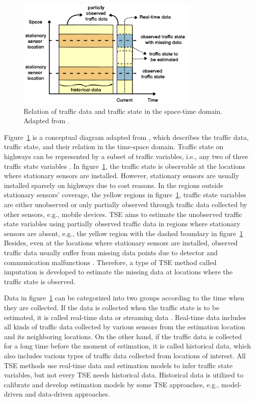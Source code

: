 \documentclass[english]{kththesis}
\begin{document}
\begin{figure}[!ht]
    \centering
    \includegraphics[width=0.8\textwidth]{tse_diagram.png}
    \caption{Relation of traffic data and traffic state in the space-time domain. Adapted from \cite{seo_tse}.}
    \label{fig:tse}
\end{figure}

Figure~\ref{fig:tse} is a conceptual diagram adapted from \cite{seo_tse}, which describes the traffic data, traffic state, and their relation in the time-space domain. Traffic state on highways can be represented by a subset of traffic variables, i.e., any two of three traffic state variables \cite{seo_tse}. In figure~\ref{fig:tse}, the traffic state is observable at the locations where stationary sensors are installed. However, stationary sensors are usually installed sparsely on highways due to cost reasons. In the regions outside stationary sensors' coverage, the yellow regions in figure~\ref{fig:tse}, traffic state variables are either unobserved or only partially observed through traffic data collected by other sensors, e.g., mobile devices. TSE aims to estimate the unobserved traffic state variables using partially observed traffic data in regions where stationary sensors are absent, e.g., the yellow region with the dashed boundary in figure~\ref{fig:tse} Besides, even at the locations where stationary sensors are installed, observed traffic data usually suffer from missing data points due to detector and communication malfunctions \cite{duan_dl_imputation, chen_imputation_regression}. Therefore, a type of TSE method called imputation is developed to estimate the missing data at locations where the traffic state is observed.

Data in figure~\ref{fig:tse} can be categorized into two groups according to the time when they are collected. If the data is collected when the traffic state is to be estimated, it is called real-time data or streaming data \cite{seo_tse}. Real-time data includes all kinds of traffic data collected by various sensors from the estimation location and its neighboring locations. On the other hand, if the traffic data is collected for a long time before the moment of estimation, it is called historical data, which also includes various types of traffic data collected from locations of interest. All TSE methods use real-time data and estimation models to infer traffic state variables, but not every TSE needs historical data. Historical data is utilized to calibrate and develop estimation models by some TSE approaches, e.g., model-driven and data-driven approaches.
\end{document}
